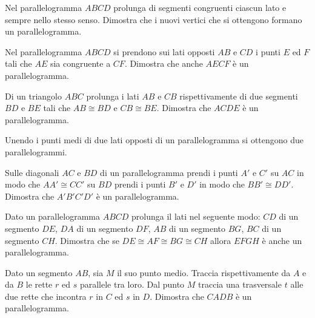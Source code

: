 \begin{multicols}{2}
\begin{esercizio}
\label{ese:4.12}
Nel parallelogramma \(ABCD\) prolunga di segmenti congruenti ciascun 
lato e sempre nello stesso senso. Dimostra che i nuovi vertici che si 
ottengono formano un parallelogramma.
\end{esercizio}

\begin{esercizio}
\label{ese:4.13}
Nel parallelogramma \(ABCD\) si prendono sui lati opposti \(AB\) e \(CD\) i 
punti \(E\) ed \(F\) tali che \(AE\) sia congruente a \(CF\). Dimostra che 
anche \(AECF\) è un parallelogramma.
\end{esercizio}

\begin{esercizio}
\label{ese:4.14}
Di un triangolo \(ABC\) prolunga i lati \(AB\) e \(CB\) rispettivamente di 
due segmenti \(BD\) e \(BE\) tali che \(AB\cong BD\) e \(CB\cong BE\). 
Dimostra che \(ACDE\) è un parallelogramma.
\end{esercizio}

\begin{esercizio}
\label{ese:4.15}
Unendo i punti medi di due lati opposti di un parallelogramma si 
ottengono due parallelogrammi.
\end{esercizio}

\begin{esercizio}
\label{ese:4.16}
Sulle diagonali \(AC\) e \(BD\) di un parallelogramma prendi i punti \(A'\) 
e \(C'\) su \(AC\) in modo che \(AA'\cong CC'\) su \(BD\) prendi i punti \(B'\) 
e \(D'\) in modo che \(BB'\cong DD'\). Dimostra che \(A'B'C'D'\) è un 
parallelogramma.
\end{esercizio}

\begin{esercizio}
\label{ese:4.17}
Dato un parallelogramma \(ABCD\) prolunga il lati nel seguente modo: 
\(CD\) di un segmento \(DE\), \(DA\) di un segmento \(DF\), \(AB\) di un 
segmento \(BG\), \(BC\) di un segmento \(CH\). Dimostra che se \(DE\cong 
AF\cong BG\cong CH\) allora \(EFGH\) è anche un parallelogramma.
\end{esercizio}

\begin{esercizio}
\label{ese:4.18}
Dato un segmento \(AB\), sia \(M\) il suo punto medio. Traccia 
rispettivamente da \(A\) e da \(B\) le rette \(r\) ed \(s\) parallele tra 
loro. Dal punto \(M\) traccia una trasversale \(t\) alle due rette che 
incontra \(r\) in \(C\) ed \(s\) in \(D\). Dimostra che \(CADB\) è un 
parallelogramma.
\end{esercizio}


\end{multicols}
